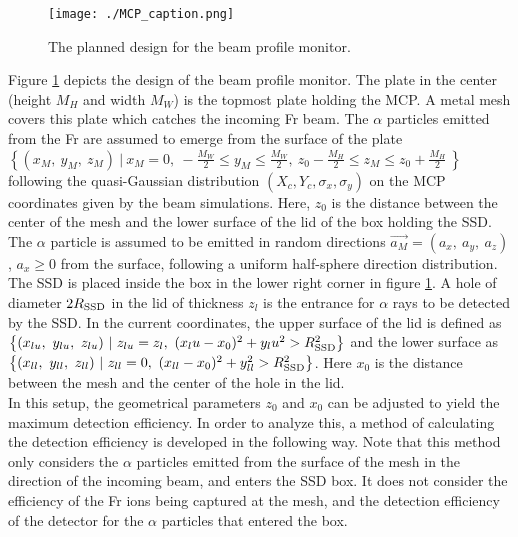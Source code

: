 \documentclass{article}
\begin{document}
\begin{figure}[H]
  \begin{center}
    \texttt{[image: ./MCP\_caption.png]}
    \caption{The planned design for the beam profile monitor.}
    \label{fig:MCP_caption}
  \end{center}
\end{figure}

Figure \ref{fig:MCP_caption} depicts the design of the beam profile monitor. The plate in the center (height $M_H$ and width $M_W$) is the topmost plate holding the MCP. A metal mesh covers this plate which catches the incoming Fr beam. The $\alpha$ particles emitted from the Fr are assumed to emerge from the surface of the plate $\left\{ (x_M,\ y_M,\ z_M)\ |\ x_M = 0,\ -\frac{M_W}{2} \le y_M \le \frac{M_W}{2},\ z_0-\frac{M_H}{2} \le z_M \le z_0+\frac{M_H}{2}\ \right\}$ following the quasi-Gaussian distribution $(X_c, Y_c, \sigma_x, \sigma_y)$ on the MCP coordinates given by the beam simulations. Here, $z_0$ is the distance between the center of the mesh and the lower surface of the lid of the box holding the SSD. The $\alpha$ particle is assumed to be emitted in random directions $\vec{a_M} = (a_x,\ a_y,\ a_z)$, $a_x \ge 0$ from the surface, following a uniform half-sphere direction distribution. \\

The SSD is placed inside the box in the lower right corner in figure \ref{fig:MCP_caption}. A hole of diameter $2R_{{\rm SSD}}$ in the lid of thickness $z_l$ is the entrance for $\alpha$ rays to be detected by the SSD. In the current coordinates, the upper surface of the lid is defined as $\left\{ (x_{lu},\ y_{lu},\ z_{lu})\ |\ z_{lu} = z_l,\ (x_lu - x_0)^2 + y_lu^2 > R_{{\rm SSD}}^2 \right\}$ and the lower surface as $\left\{ (x_{ll},\ y_{ll},\ z_{ll})\ |\ z_{ll} = 0,\ (x_{ll} - x_0)^2 + y_{ll}^2 > R_{{\rm SSD}}^2 \right\}$. Here $x_0$ is the distance between the mesh and the center of the hole in the lid.\\

In this setup, the geometrical parameters $z_0$ and $x_0$ can be adjusted to yield the maximum detection efficiency. In order to analyze this, a method of calculating the detection efficiency is developed in the following way. Note that this method only considers the $\alpha$ particles emitted from the surface of the mesh in the direction of the incoming beam, and enters the SSD box. It does not consider the efficiency of the Fr ions being captured at the mesh, and the detection efficiency of the detector for the $\alpha$ particles that entered the box.\\
\end{document}
